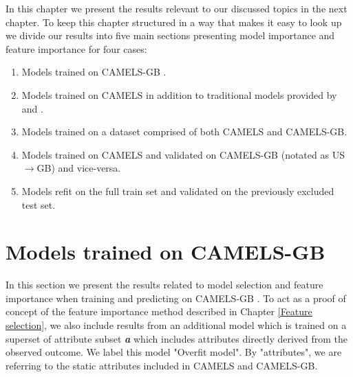 In this chapter we present the results relevant to our discussed topics in the 
next chapter. To keep this chapter structured in a way that makes it easy to 
look up we divide our results into five main sections presenting model importance 
and feature importance for four cases:
\begin{enumerate}
    \item Models trained on CAMELS-GB \citep{CAMELS_GB}.
    \item Models trained on CAMELS \citep{CAMELS_US} in addition to traditional 
        models provided by \citet{CAMELS_hydroshare} and \citet{NWMbench}.
    \item Models trained on a dataset comprised of both CAMELS and CAMELS-GB.
    \item Models trained on CAMELS and validated on CAMELS-GB (notated as US$\rightarrow$GB) 
        and vice-versa.
    \item Models refit on the full train set and validated on the previously excluded 
        test set.
\end{enumerate}
\section{Models trained on CAMELS-GB}
\label{CAMELS-GB results}
In this section we present the results related to model selection and feature 
importance when training and predicting on CAMELS-GB \citep{CAMELS_GB}. To act 
as a proof of concept of the feature importance method described in Chapter 
\ref{Feature selection}, we also include results from an additional model which
is trained on a superset of attribute subset \textbf{\textit{a}} which includes 
attributes directly derived from the observed outcome. We label this model "Overfit model". 
By "attributes", we are referring to the static attributes included in CAMELS and 
CAMELS-GB.

